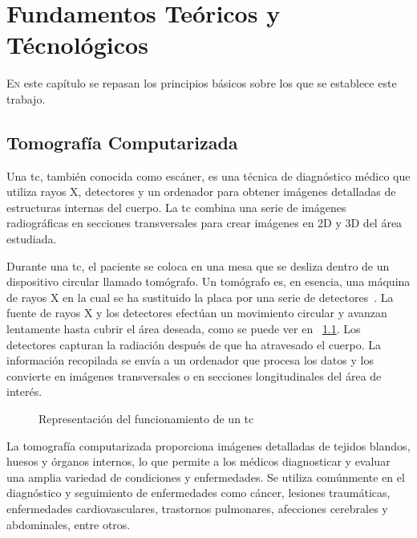 \chapter{Fundamentos Teóricos y Técnológicos}
\label{chap:ft}


\lettrine{E}{n} este capítulo se repasan los principios básicos sobre los que se establece este trabajo.
\section{Tomografía Computarizada}

Una \gls{tc}, también conocida como escáner, es una técnica de
diagnóstico médico que utiliza rayos X, detectores y un ordenador para
obtener imágenes detalladas de estructuras internas del cuerpo. La
\gls{tc} combina una serie de imágenes radiográficas en secciones
transversales para crear imágenes en 2D y 3D del área estudiada.

Durante una \gls{tc}, el paciente se coloca en una mesa que se
desliza dentro de un dispositivo circular llamado tomógrafo. Un
tomógrafo es, en esencia, una máquina de rayos X en la cual se ha
sustituido la placa por una serie de
detectores~\cite{muniz2006introduccion}. La fuente de rayos X y los
detectores efectúan un movimiento circular y avanzan lentamente hasta
cubrir el área deseada, como se puede ver en
\figurename~\ref{fig:tac}. Los detectores capturan la radiación
después de que ha atravesado el cuerpo. La información recopilada se
envía a un ordenador que procesa los datos y los convierte en imágenes
transversales o en secciones longitudinales del área de interés.

\begin{figure}%
	\centering
	\qquad
	\caption{Representación del funcionamiento de un \acrshort{tc}}%
	\label{fig:tac}%
\end{figure}

La tomografía computarizada proporciona imágenes detalladas de tejidos
blandos, huesos y órganos internos, lo que permite a los médicos
diagnosticar y evaluar una amplia variedad de condiciones y
enfermedades. Se utiliza comúnmente en el diagnóstico y seguimiento de
enfermedades como cáncer, lesiones traumáticas, enfermedades
cardiovasculares, trastornos pulmonares, afecciones cerebrales y
abdominales, entre otros.



